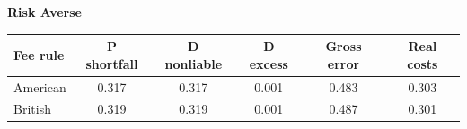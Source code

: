 \documentclass[10pt,border=5pt,varwidth=17cm]{standalone}
\begin{document}
\begingroup
\small
\setlength{\tabcolsep}{5pt}
\renewcommand{\arraystretch}{1.20}
\noindent\textbf{Risk Averse}\par\smallskip
\noindent\begin{tabularx}{\linewidth}{@{}>{\raggedright\arraybackslash}Xccccc@{}}
\toprule
\textbf{Fee rule} & \textbf{P shortfall} & \textbf{D nonliable} & \textbf{D excess} & \textbf{Gross error} & \textbf{Real costs} \\
\midrule
American & 0.317 & 0.317 & 0.001 & 0.483 & 0.303 \\
British & 0.319 & 0.319 & 0.001 & 0.487 & 0.301 \\
\bottomrule\end{tabularx}\par\medskip
\endgroup
\end{document}
